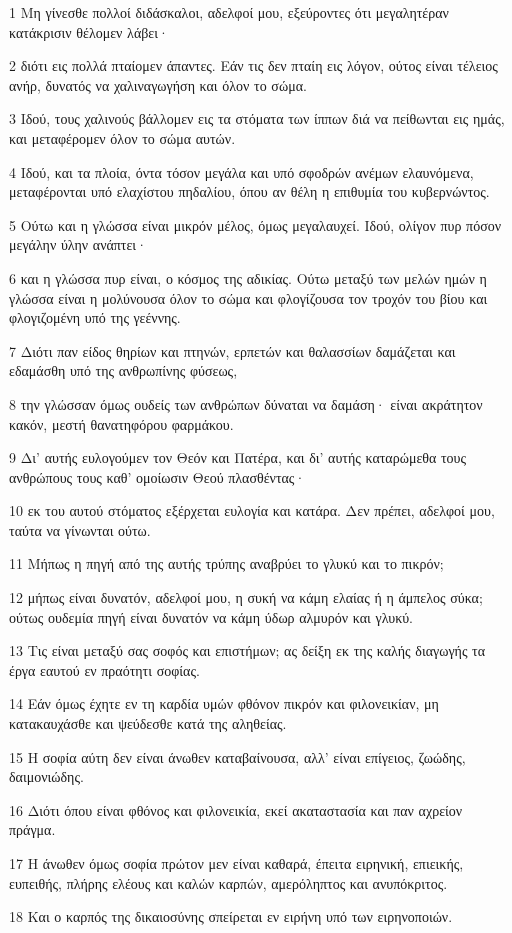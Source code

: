 \par 1 Μη γίνεσθε πολλοί διδάσκαλοι, αδελφοί μου, εξεύροντες ότι μεγαλητέραν κατάκρισιν θέλομεν λάβει·
\par 2 διότι εις πολλά πταίομεν άπαντες. Εάν τις δεν πταίη εις λόγον, ούτος είναι τέλειος ανήρ, δυνατός να χαλιναγωγήση και όλον το σώμα.
\par 3 Ιδού, τους χαλινούς βάλλομεν εις τα στόματα των ίππων διά να πείθωνται εις ημάς, και μεταφέρομεν όλον το σώμα αυτών.
\par 4 Ιδού, και τα πλοία, όντα τόσον μεγάλα και υπό σφοδρών ανέμων ελαυνόμενα, μεταφέρονται υπό ελαχίστου πηδαλίου, όπου αν θέλη η επιθυμία του κυβερνώντος.
\par 5 Ούτω και η γλώσσα είναι μικρόν μέλος, όμως μεγαλαυχεί. Ιδού, ολίγον πυρ πόσον μεγάλην ύλην ανάπτει·
\par 6 και η γλώσσα πυρ είναι, ο κόσμος της αδικίας. Ούτω μεταξύ των μελών ημών η γλώσσα είναι η μολύνουσα όλον το σώμα και φλογίζουσα τον τροχόν του βίου και φλογιζομένη υπό της γεέννης.
\par 7 Διότι παν είδος θηρίων και πτηνών, ερπετών και θαλασσίων δαμάζεται και εδαμάσθη υπό της ανθρωπίνης φύσεως,
\par 8 την γλώσσαν όμως ουδείς των ανθρώπων δύναται να δαμάση· είναι ακράτητον κακόν, μεστή θανατηφόρου φαρμάκου.
\par 9 Δι' αυτής ευλογούμεν τον Θεόν και Πατέρα, και δι' αυτής καταρώμεθα τους ανθρώπους τους καθ' ομοίωσιν Θεού πλασθέντας·
\par 10 εκ του αυτού στόματος εξέρχεται ευλογία και κατάρα. Δεν πρέπει, αδελφοί μου, ταύτα να γίνωνται ούτω.
\par 11 Μήπως η πηγή από της αυτής τρύπης αναβρύει το γλυκύ και το πικρόν;
\par 12 μήπως είναι δυνατόν, αδελφοί μου, η συκή να κάμη ελαίας ή η άμπελος σύκα; ούτως ουδεμία πηγή είναι δυνατόν να κάμη ύδωρ αλμυρόν και γλυκύ.
\par 13 Τις είναι μεταξύ σας σοφός και επιστήμων; ας δείξη εκ της καλής διαγωγής τα έργα εαυτού εν πραότητι σοφίας.
\par 14 Εάν όμως έχητε εν τη καρδία υμών φθόνον πικρόν και φιλονεικίαν, μη κατακαυχάσθε και ψεύδεσθε κατά της αληθείας.
\par 15 Η σοφία αύτη δεν είναι άνωθεν καταβαίνουσα, αλλ' είναι επίγειος, ζωώδης, δαιμονιώδης.
\par 16 Διότι όπου είναι φθόνος και φιλονεικία, εκεί ακαταστασία και παν αχρείον πράγμα.
\par 17 Η άνωθεν όμως σοφία πρώτον μεν είναι καθαρά, έπειτα ειρηνική, επιεικής, ευπειθής, πλήρης ελέους και καλών καρπών, αμερόληπτος και ανυπόκριτος.
\par 18 Και ο καρπός της δικαιοσύνης σπείρεται εν ειρήνη υπό των ειρηνοποιών.

